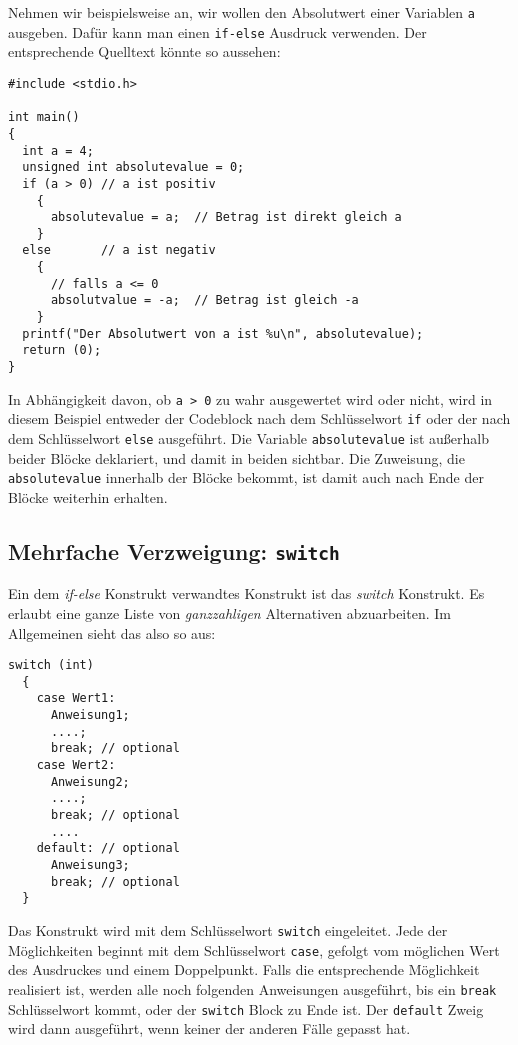Nehmen wir beispielsweise an, wir wollen den Absolutwert einer Variablen \verb|a| ausgeben.
Dafür kann man einen \verb|if-else| Ausdruck verwenden.
Der entsprechende Quelltext könnte so aussehen:

\begin{minipage}{\linewidth}
\begin{lstlisting}
#include <stdio.h>

int main()
{
  int a = 4;
  unsigned int absolutevalue = 0;
  if (a > 0) // a ist positiv
    {
      absolutevalue = a;  // Betrag ist direkt gleich a 
    }
  else       // a ist negativ
    {
      // falls a <= 0
      absolutvalue = -a;  // Betrag ist gleich -a
    }
  printf("Der Absolutwert von a ist %u\n", absolutevalue);
  return (0);
}
\end{lstlisting}
\end{minipage}
In Abhängigkeit davon, ob \verb|a > 0| zu wahr ausgewertet wird oder nicht, wird in diesem Beispiel entweder der Codeblock nach dem Schlüsselwort \verb|if| oder der nach dem Schlüsselwort \verb|else| ausgeführt.
Die Variable \verb|absolutevalue| ist außerhalb beider Blöcke deklariert, und damit in beiden sichtbar.
Die Zuweisung, die \verb|absolutevalue| innerhalb der Blöcke bekommt, ist damit auch nach Ende der Blöcke weiterhin erhalten.

\subsection{Mehrfache Verzweigung: \texttt{switch}}
 
Ein dem \emph{if-else} Konstrukt verwandtes Konstrukt ist das \emph{switch} Konstrukt.
Es erlaubt eine ganze Liste von \emph{ganzzahligen} Alternativen abzuarbeiten.
Im Allgemeinen sieht das also so aus:

\begin{minipage}{\linewidth}
\begin{lstlisting}[caption={switch statement}, belowcaptionskip=0.3em]
switch (int)
  {
    case Wert1:
      Anweisung1;
      ....;
      break; // optional
    case Wert2:
      Anweisung2;
      ....;
      break; // optional
      ....
    default: // optional
      Anweisung3;
      break; // optional
  }
\end{lstlisting}
\end{minipage}
Das Konstrukt wird mit dem Schlüsselwort \verb|switch| eingeleitet.
Jede der Möglichkeiten beginnt mit dem Schlüsselwort \verb|case|, gefolgt vom möglichen Wert des Ausdruckes und einem Doppelpunkt. 
Falls die entsprechende Möglichkeit realisiert ist, werden alle noch folgenden Anweisungen ausgeführt, bis ein \verb|break| Schlüsselwort kommt, oder der \verb|switch| Block zu Ende ist.
Der \verb|default| Zweig wird dann ausgeführt, wenn keiner der anderen Fälle gepasst hat.

